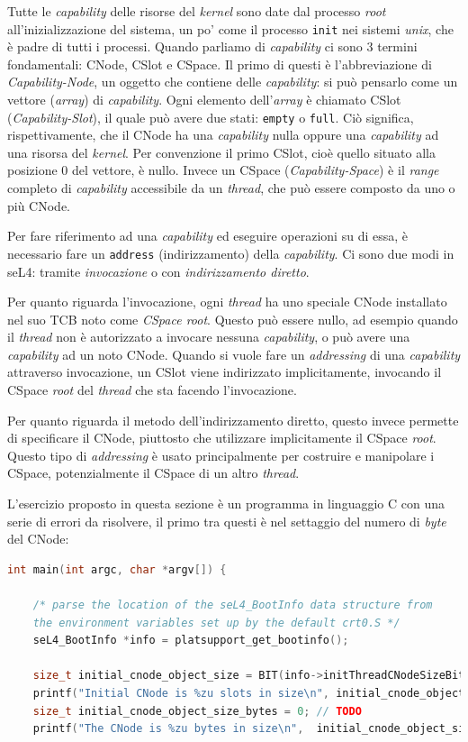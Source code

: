 Tutte le \textit{capability} delle risorse del \textit{kernel} sono date dal processo \textit{root} all'inizializzazione del sistema, un po' come il processo \texttt{init} nei sistemi \textit{unix}, che è padre di tutti i processi. Quando parliamo di \textit{capability} ci sono 3 termini fondamentali: CNode, CSlot e CSpace. Il primo di questi è l'abbreviazione di \textit{Capability-Node}, un oggetto che contiene delle \textit{capability}: si può pensarlo come un vettore (\textit{array}) di \textit{capability}. Ogni elemento dell'\textit{array} è chiamato CSlot (\textit{Capability-Slot}), il quale può avere due stati: \texttt{empty} o \texttt{full}. Ciò significa, rispettivamente, che il CNode ha una \textit{capability} nulla oppure una \textit{capability} ad una risorsa del \textit{kernel}. Per convenzione il primo CSlot, cioè quello situato alla posizione 0 del vettore, è nullo. Invece un CSpace (\textit{Capability-Space}) è il \textit{range} completo di \textit{capability} accessibile da un \textit{thread}, che può essere composto da uno o più CNode.

Per fare riferimento ad una \textit{capability} ed eseguire operazioni su di essa, è necessario fare un \texttt{address} (indirizzamento) della \textit{capability}. Ci sono due modi in seL4: tramite \textit{invocazione} o con \textit{indirizzamento diretto}.

Per quanto riguarda l'invocazione, ogni \textit{thread} ha uno speciale CNode installato nel suo TCB noto come \textit{CSpace root}. Questo può essere nullo, ad esempio quando il \textit{thread} non è autorizzato a invocare nessuna \textit{capability}, o può avere una \textit{capability} ad un noto CNode. Quando si vuole fare un \textit{addressing} di una \textit{capability} attraverso invocazione, un CSlot viene indirizzato implicitamente, invocando il CSpace \textit{root} del \textit{thread} che sta facendo l'invocazione.

Per quanto riguarda il metodo dell'indirizzamento diretto, questo invece permette di specificare il CNode, piuttosto che utilizzare implicitamente il CSpace \textit{root}. Questo tipo di \textit{addressing}  è usato principalmente per costruire e manipolare i CSpace, potenzialmente il CSpace di un altro \textit{thread}.

L'esercizio proposto in questa sezione è un programma in linguaggio C con una serie di errori da risolvere, il primo tra questi è nel settaggio del numero di \textit{byte} del CNode:
\begin{lstlisting}[language=C++]
int main(int argc, char *argv[]) {

    /* parse the location of the seL4_BootInfo data structure from
    the environment variables set up by the default crt0.S */
    seL4_BootInfo *info = platsupport_get_bootinfo();

    size_t initial_cnode_object_size = BIT(info->initThreadCNodeSizeBits);
    printf("Initial CNode is %zu slots in size\n", initial_cnode_object_size);
    size_t initial_cnode_object_size_bytes = 0; // TODO
    printf("The CNode is %zu bytes in size\n", 	initial_cnode_object_size_bytes);
\end{lstlisting}

